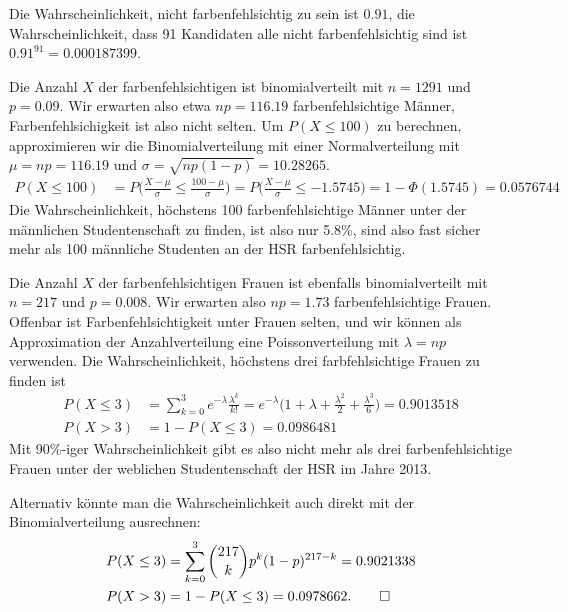 \begin{loesung}
\begin{teilaufgaben}
\item
Die Wahrscheinlichkeit, nicht farbenfehlsichtig zu sein ist $0.91$, die
Wahrscheinlichkeit, dass 91 Kandidaten alle nicht farbenfehlsichtig sind
ist $0.91^{91}=0.000187399$.
\item
Die Anzahl $X$ der farbenfehlsichtigen ist binomialverteilt mit $n=1291$ und
$p=0.09$. Wir erwarten also etwa $np=116.19$ farbenfehlsichtige Männer,
Farbenfehlsichigkeit ist also nicht selten. Um $P(X\le 100)$ zu
berechnen, approximieren wir die Binomialverteilung mit einer Normalverteilung
mit $\mu=np=116.19$ und $\sigma=\sqrt{np(1-p)}=10.28265$.
\begin{align*}
P(X\le 100)
&=
P\biggl(
\frac{X-\mu}{\sigma}\le \frac{100-\mu}{\sigma}
\biggr)
=
P\biggl(
\frac{X-\mu}{\sigma}\le -1.5745
\biggr)
=
1-\Phi(1.5745)
=
0.0576744
\end{align*}
Die Wahrscheinlichkeit, höchstens 100 farbenfehlsichtige Männer unter
der männlichen Studentenschaft zu finden, ist also nur 5.8\%, sind
also fast sicher mehr als 100 männliche Studenten an der HSR
farbenfehlsichtig.
\item
Die Anzahl $X$ der farbenfehlsichtigen Frauen ist ebenfalls binomialverteilt
mit $n=217$ und $p=0.008$. Wir erwarten also $np=1.73$ farbenfehlsichtige
Frauen. Offenbar ist Farbenfehlsichtigkeit unter Frauen selten, und wir
können als Approximation der Anzahlverteilung eine Poissonverteilung mit
$\lambda = np$ verwenden.
Die Wahrscheinlichkeit, höchstens drei farbfehlsichtige Frauen zu finden
ist
\begin{align*}
P(X\le 3)&=\sum_{k=0}^3 e^{-\lambda}\frac{\lambda^k}{k!}=
e^{-\lambda}\biggl(
1+\lambda +\frac{\lambda^2}{2}+\frac{\lambda^3}{6}
\biggr)
=
0.9013518
\\
P(X>3)&=1-P(X\le 3)=
0.0986481
\end{align*}
Mit 90\%-iger Wahrscheinlichkeit gibt es also nicht mehr als drei
farbenfehlsichtige Frauen unter der weblichen Studentenschaft
der HSR im Jahre 2013.

Alternativ könnte man die Wahrscheinlichkeit auch direkt mit der 
Binomialverteilung ausrechnen:
\begin{align*}
P(X\le 3)
&=
\sum_{k=0}^3\binom{217}{k}p^k(1-p)^{217-k}=0.9021338
\\
P(X>3)&=1-P(X\le 3)=0.0978662.
\qedhere
\end{align*}
\end{teilaufgaben}
\end{loesung}


